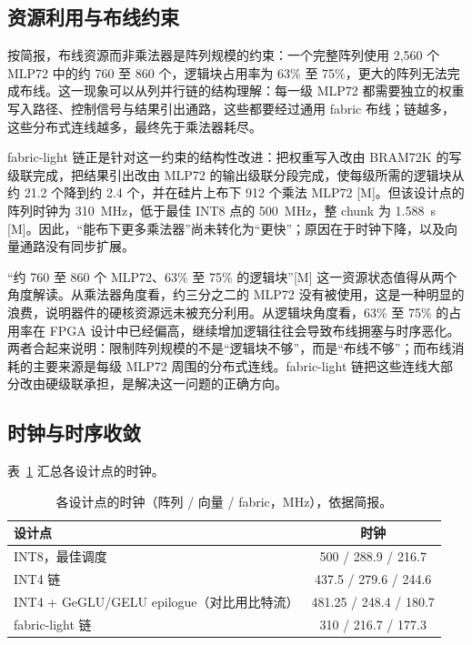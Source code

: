 \documentclass[a4paper,10.5pt]{ctexart}
\newcommand{\tM}{\textsf{[M]}}              %
\begin{document}
\subsection{资源利用与布线约束}\label{sec:routing}

按简报，布线资源而非乘法器是阵列规模的约束：一个完整阵列使用 2,560 个 MLP72 中的约 760 至 860 个，逻辑块占用率为 63\% 至 75\%，更大的阵列无法完成布线。这一现象可以从列并行链的结构理解：每一级 MLP72 都需要独立的权重写入路径、控制信号与结果引出通路，这些都要经过通用 fabric 布线；链越多，这些分布式连线越多，最终先于乘法器耗尽。

fabric-light 链正是针对这一约束的结构性改进：把权重写入改由 BRAM72K 的写级联完成，把结果引出改由 MLP72 的输出级联分段完成，使每级所需的逻辑块从约 21.2 个降到约 2.4 个，并在硅片上布下 912 个乘法 MLP72 \tM。但该设计点的阵列时钟为 310~MHz，低于最佳 INT8 点的 500~MHz，整 chunk 为 1.588~s \tM。因此，“能布下更多乘法器”尚未转化为“更快”；原因在于时钟下降，以及向量通路没有同步扩展。

“约 760 至 860 个 MLP72、63\% 至 75\% 的逻辑块”\tM{} 这一资源状态值得从两个角度解读。从乘法器角度看，约三分之二的 MLP72 没有被使用，这是一种明显的浪费，说明器件的硬核资源远未被充分利用。从逻辑块角度看，63\% 至 75\% 的占用率在 FPGA 设计中已经偏高，继续增加逻辑往往会导致布线拥塞与时序恶化。两者合起来说明：限制阵列规模的不是“逻辑块不够”，而是“布线不够”；而布线消耗的主要来源是每级 MLP72 周围的分布式连线。fabric-light 链把这些连线大部分改由硬级联承担，是解决这一问题的正确方向。

\subsection{时钟与时序收敛}\label{sec:timing}

表~\ref{tab:clocks} 汇总各设计点的时钟。

\begin{table}[h]
\centering
\caption{各设计点的时钟（阵列 / 向量 / fabric，MHz），依据简报。}
\label{tab:clocks}
\small
\begin{tabular}{l c}
\toprule
设计点 & 时钟 \\
\midrule
INT8，最佳调度 & 500 / 288.9 / 216.7 \\
INT4 链 & 437.5 / 279.6 / 244.6 \\
INT4 + GeGLU/GELU epilogue（对比用比特流） & 481.25 / 248.4 / 180.7 \\
fabric-light 链 & 310 / 216.7 / 177.3 \\
\bottomrule
\end{tabular}
\end{table}
\end{document}
